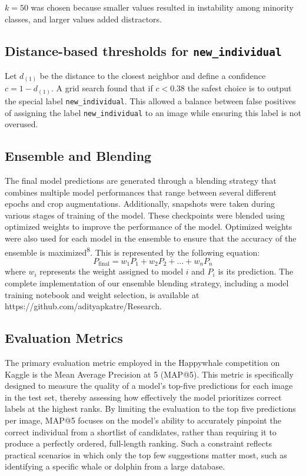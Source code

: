 \documentclass[twocolumn]{article}
\begin{document}
$k=50$ was chosen because smaller values resulted in instability among minority classes, and larger values added distractors.

\subsection{Distance-based thresholds for \texttt{new_individual}}

Let $d_{(1)}$ be the distance to the closest neighbor and define a confidence $c = 1 - d_{(1)}$.
A grid search found that if $c < 0.38$ the safest choice is to output
the special label \texttt{new\_individual}.
This allowed a balance between false positives of assigning the label \texttt{new_individual} to an image while ensuring this label is not overused.

\subsection{Ensemble and Blending}

The final model predictions are generated through a blending strategy that combines multiple model performances that range between several different epochs and crop augmentations. Additionally, snapshots were taken during various stages of training of the model. These checkpoints were blended using optimized weights to improve the performance of the model. Optimized weights were also used for each model in the ensemble to ensure that the accuracy of the ensemble is maximized\textsuperscript{8}. This is represented by the following equation:
\[
P_{\text{final}} = w_1 P_1 + w_2 P_2 + \dots + w_n P_n
\]
 where $w_i$ represents the weight assigned to model $i$ and $P_i$ is its prediction. The complete implementation of our ensemble blending strategy, including a model training notebook and weight selection, is available at https://github.com/adityapkatre/Research.

\subsection{Evaluation Metrics}

The primary evaluation metric employed in the Happywhale competition on Kaggle is the Mean Average Precision at 5 (MAP@5). This metric is specifically designed to measure the quality of a model’s top-five predictions for each image in the test set, thereby assessing how effectively the model prioritizes correct labels at the highest ranks. By limiting the evaluation to the top five predictions per image, MAP@5 focuses on the model’s ability to accurately pinpoint the correct individual from a shortlist of candidates, rather than requiring it to produce a perfectly ordered, full-length ranking. Such a constraint reflects practical scenarios in which only the top few suggestions matter most, such as identifying a specific whale or dolphin from a large database. 
\end{document}
